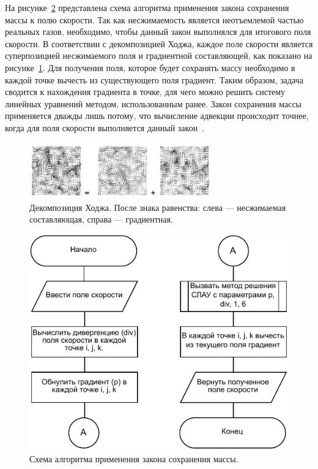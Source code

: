 На рисунке~\ref{fig:project} представлена схема алгоритма применения закона сохранения массы к полю скорости. Так как несжимаемость является неотъемлемой частью реальных газов, необходимо, чтобы данный закон выполнялся для итогового поля скорости. В соответствии с декомпозицией Ходжа, каждое поле скорости является суперпозицией несжимаемого поля и градиентной составляющей, как показано на рисунке~\ref{fig:hodge}. Для получения поля, которое будет сохранять массу необходимо в каждой точке вычесть из существующего поля градиент. Таким образом, задача сводится к нахождения градиента в точке, для чего можно решить систему линейных уравнений методом, использованным ранее. Закон сохранения массы применяется дважды лишь потому, что вычисление адвекции происходит точнее, когда для поля скорости выполняется данный закон~\cite{stam}.

\begin{figure}[H]
	\centering
	\includegraphics[width=0.7\textwidth,page=1]{assets/img/hodge.png}
	\caption{Декомпозиция Ходжа. После знака равенства: слева --- несжимаемая составляющая, справа --- градиентная.}
	\label{fig:hodge}
\end{figure}

\begin{figure}[H]
	\centering
	\includegraphics[width=1.0\textwidth,page=1]{assets/img/project.pdf}
	\caption{Схема алгоритма применения закона сохранения массы.}
	\label{fig:project}
\end{figure}

